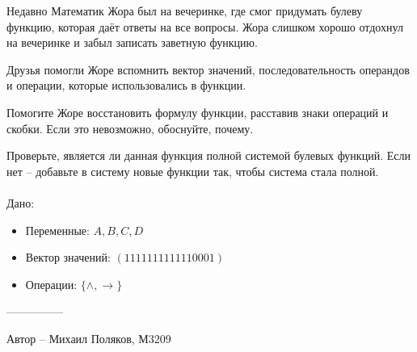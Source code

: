 \question
Недавно Математик Жора был на вечеринке, где смог придумать булеву функцию, которая даёт ответы на все вопросы. Жора слишком хорошо отдохнул на вечеринке и забыл записать заветную функцию.

Друзья помогли Жоре вспомнить вектор значений, последовательность операндов и операции, которые использовались в функции.

Помогите Жоре восстановить формулу функции, расставив знаки операций и скобки. Если это невозможно, обоснуйте, почему.

Проверьте, является ли данная функция полной системой булевых функций. Если нет -- добавьте в систему новые функции так, чтобы система стала полной.
\\
\\
Дано:
\begin{itemize}
\item Переменные: $A, B, C, D$
\item Вектор значений: $(1111111111110001)$
\item Операции: $\{\land, \rightarrow\}$
\end{itemize}

---------------

Автор -- Михаил Поляков, М3209